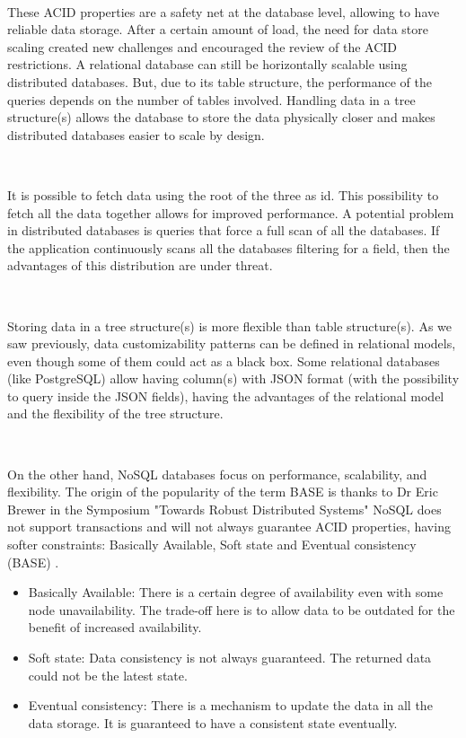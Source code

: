 \documentclass[12pt,english]{article} %
\begin{document}
\

These ACID properties are a safety net at the database level, allowing to have reliable data storage.
After a certain amount of load, the need for data store scaling created new challenges and encouraged the review of the ACID restrictions.
A relational database can still be horizontally scalable using distributed databases.
But, due to its table structure, the performance of the queries depends on the number of tables involved.
Handling data in a tree structure(s) allows the database to store the data physically closer and makes distributed databases easier to scale by design.

\

It is possible to fetch data using the root of the three as id.
This possibility to fetch all the data together allows for improved performance.
A potential problem in distributed databases is queries that force a full scan of all the databases.
If the application continuously scans all the databases filtering for a field, then the advantages of this distribution are under threat.

\

Storing data in a tree structure(s) is more flexible than table structure(s).
As we saw previously, data customizability patterns can be defined in relational models, even though some of them could act as a black box.
Some relational databases (like PostgreSQL) allow having column(s) with JSON format (with the possibility to query inside the JSON fields), having the advantages of the relational model and the flexibility of the tree structure.

\

On the other hand, NoSQL databases focus on performance, scalability, and flexibility.
The origin of the popularity of the term BASE is thanks to Dr Eric Brewer in the Symposium "Towards Robust Distributed Systems" \cite{acid-base-database-transaction-processing}
NoSQL does not support transactions \cite{comparison-query-performance-relational-and-non-relational-databases} and will not always guarantee ACID properties, having softer constraints: Basically Available, Soft state and Eventual consistency (BASE) \cite{acid-base-database-transaction-processing}.

\begin{itemize}
    \item Basically Available: There is a certain degree of availability even with some node unavailability.
    The trade-off here is to allow data to be outdated for the benefit of increased availability.
    \item Soft state: Data consistency is not always guaranteed.
    The returned data could not be the latest state.
    \item Eventual consistency: There is a mechanism to update the data in all the data storage.
    It is guaranteed to have a consistent state eventually.
\end{itemize}
\end{document}
